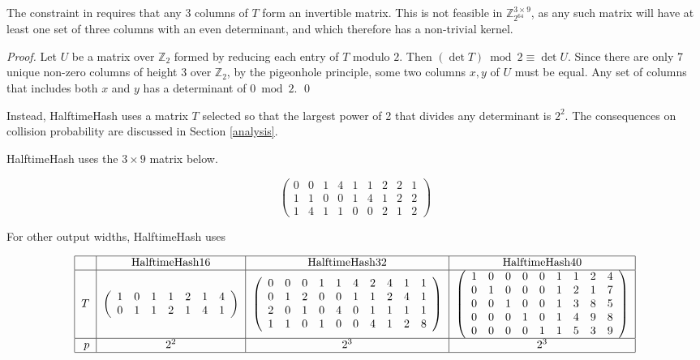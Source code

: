 \documentclass[runningheads]{llncs}
\newcommand{\ints}{\mathbb{Z}}
\begin{document}
The constraint in \cite{ehc-nandi} requires that any 3 columns of $T$ form an invertible matrix.
This is not feasible in $\ints_{2^{64}}^{3 \times 9}$, as any such matrix will have at least one set of three columns with an even determinant, and which therefore has a non-trivial kernel.

\begin{proof}
  Let $U$ be a matrix over $\ints_2$ formed by reducing each entry of $T$ modulo $2$.
  Then $(\det T) \bmod 2 \equiv \det U$.
  Since there are only 7 unique non-zero columns of height 3 over $\ints_2$, by the pigeonhole principle, some two columns $x, y$ of $U$ must be equal.
  Any set of columns that includes both $x$ and $y$ has a determinant of $0 \bmod 2$.
  \qed
\end{proof}

Instead, HalftimeHash uses a matrix $T$ selected so that the largest power of 2 that divides any determinant is $2^2$.
The consequences on collision probability are discussed in Section \ref{analysis}.

HalftimeHash uses the $3 \times 9$ matrix below.

\begin{displaymath}
  \left(
\begin{array}{rrrrrrrrr}
  0 & 0 & 1 & 4 & 1 & 1 & 2 & 2 & 1\\
  1 & 1 & 0 & 0 & 1 & 4 & 1 & 2 & 2\\
  1 & 4 & 1 & 1 & 0 & 0 & 2 & 1 & 2
\end{array}
\right)
\end{displaymath}

For other output widths, HalftimeHash uses

\[
\begin{tabular}{|r|c|c|c|}
  \hline  & HalftimeHash16 & HalftimeHash32 & HalftimeHash40 \\
  \hline $T$ & 
$\left(
\begin{array}{rrrrrrrrrrrr}
  1 & 0 & 1 & 1 & 2 & 1 & 4\\
  0 & 1 & 1 & 2 & 1 & 4 & 1
\end{array}
\right)$
&
$\left(
\begin{array}{rrrrrrrrrr}
 0 & 0 & 0 & 1 & 1 & 4 & 2 & 4 & 1 & 1 \\
 0 & 1 & 2 & 0 & 0 & 1 & 1 & 2 & 4 & 1 \\
 2 & 0 & 1 & 0 & 4 & 0 & 1 & 1 & 1 & 1 \\
 1 & 1 & 0 & 1 & 0 & 0 & 4 & 1 & 2 & 8
\end{array}
\right)$
&
$\left(
\begin{array}{rrrrrrrrr}
 1 & 0 & 0 & 0 & 0 & 1 & 1 & 2 & 4\\
 0 & 1 & 0 & 0 & 0 & 1 & 2 & 1 & 7\\
 0 & 0 & 1 & 0 & 0 & 1 & 3 & 8 & 5\\
 0 & 0 & 0 & 1 & 0 & 1 & 4 & 9 & 8\\
 0 & 0 & 0 & 0 & 1 & 1 & 5 & 3 & 9
\end{array}
\right)$ \\
\hline $p$ & $2^2$ & $2^3$ & $2^3$ \\
\hline
\end{tabular}
\]
\end{document}
